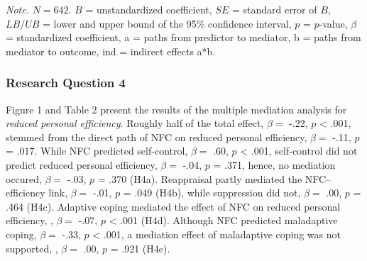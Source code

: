 \documentclass[
  man]{apa6}
\begin{document}
\begin{table}[tbp]
\begin{center}
\begin{threeparttable}
{}

\begin{tablenotes}[para]
\normalsize{\textit{Note.} $N=642$. $B$ = unstandardized coefficient, $SE$ = standard error of $B$, $LB/UB$ = lower and upper bound of the 95\% confidence interval, $p$ = $p$-value, $\beta$ = standardized coefficient, a = paths from predictor to mediator, b = paths from mediator to outcome, ind = indirect effects a*b.}
\end{tablenotes}

\end{threeparttable}
\end{center}

\end{table}

\subsubsection{Research Question 4}\label{research-question-4}

Figure 1 and Table 2 present the results of the multiple mediation analysis for \emph{reduced personal efficiency}. Roughly half of the total effect, \(\beta=\) -.22, \(p\) \textless{} .001, stemmed from the direct path of NFC on reduced personal efficiency, \(\beta=\) -.11, \(p\) = .017. While NFC predicted self-control, \(\beta=\) .60, \(p\) \textless{} .001, self-control did not predict reduced personal efficiency, \(\beta=\) -.04, \(p\) = .371, hence, no mediation occured, \(\beta=\) -.03, \(p\) = .370 (H4a). Reappraisal partly mediated the NFC--efficiency link, \(\beta=\) -.01, \(p\) = .049 (H4b), while suppression did not, \(\beta=\) .00, \(p\) = .464 (H4c). Adaptive coping mediated the effect of NFC on reduced personal efficiency, , \(\beta=\) -.07, \(p\) \textless{} .001 (H4d). Although NFC predicted maladaptive coping, \(\beta=\) -.33, \(p\) \textless{} .001, a mediation effect of maladaptive coping was not supported, , \(\beta=\) .00, \(p\) = .921 (H4e).
\end{document}
